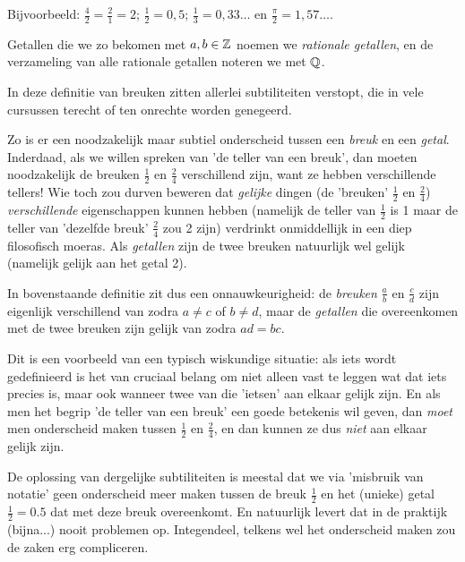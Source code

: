 \documentclass[numbers]{ximera}
\begin{document}
Bijvoorbeeld: $\frac42=\frac21=2$; \quad $\frac12=0,5$; \quad $\frac13=0,33\dots$ en $\frac{\pi}{2}=1,57\dots$. 

Getallen die we zo bekomen met $a,b\in\mathbb{Z}$ noemen we \textit{rationale getallen}, en de verzameling van alle rationale getallen noteren we met $\mathbb{Q}$.

\begin{expandable}
	\begin{uitweiding}
		In deze definitie van breuken zitten allerlei subtiliteiten verstopt, die in vele cursussen terecht of ten onrechte worden genegeerd. 
		
		Zo is er een noodzakelijk maar subtiel onderscheid tussen een \textit{breuk} en een \textit{getal}. Inderdaad, als we willen spreken van 'de teller van een breuk', dan moeten noodzakelijk de breuken $\frac 12$ en $\frac 24$ verschillend zijn, want ze hebben verschillende tellers! Wie toch zou durven beweren dat \textit{gelijke} dingen (de 'breuken' $\frac 12$ en $\frac 24$)  \textit{verschillende} eigenschappen kunnen hebben (namelijk de teller van $\frac 12$ is 1 maar de teller van 'dezelfde breuk' $\frac24$ zou 2 zijn) verdrinkt onmiddellijk in een diep filosofisch moeras. Als \textit{getallen} zijn de twee breuken natuurlijk wel gelijk (namelijk gelijk aan het getal 2).
		
		In bovenstaande definitie zit dus een onnauwkeurigheid: de \textit{breuken} $\frac ab$ en $\frac cd$ zijn eigenlijk verschillend van zodra $a\neq c$ of $b\neq d$, maar de \textit{getallen} die overeenkomen met de twee breuken zijn gelijk van zodra $ad = bc$.
		
		Dit is een voorbeeld van een typisch wiskundige situatie: als iets wordt gedefinieerd is het van cruciaal belang om niet alleen vast te leggen wat dat iets precies is, maar ook wanneer twee van die 'ietsen' aan elkaar gelijk zijn. En als men het begrip 'de teller van een breuk' een goede betekenis wil geven, dan \textit{moet} men onderscheid maken tussen $\frac 12$ en $\frac 24$, en dan kunnen ze dus \textit{niet} aan elkaar gelijk zijn. 
		
		De oplossing van dergelijke subtiliteiten is meestal dat we via 'misbruik van notatie' geen onderscheid meer maken tussen de breuk $\frac 12$ en het (unieke) getal $\frac 12 = 0.5$ dat met deze breuk overeenkomt. En natuurlijk levert dat in de praktijk (bijna...) nooit problemen op. Integendeel, telkens wel het onderscheid maken zou de zaken erg compliceren. 
		

\end{uitweiding}
\end{expandable}
\end{document}
